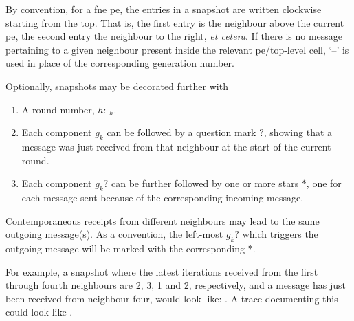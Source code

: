 By convention, for a \gls{fne} \gls{pe}, the entries in a snapshot are written clockwise starting from the top.  That is, the first entry is the neighbour above the current \gls{pe}, the second entry the neighbour to the right, \textit{et cetera}.  If there is no message pertaining to a given neighbour present inside the relevant \gls{pe}/top-level cell, `--' is used in place of the corresponding generation number.

Optionally, snapshots may be decorated further with 
{\renewcommand{\theenumi}{\alph{enumi}}
\begin{enumerate}
    \item A round number, \(h\): \(_h\).
    \item Each component \(g_k\) can be followed by a question mark \(?\), showing that a message was just received from that neighbour at the start of the current round.
    \item Each component \(g_k?\) can be further followed by one or more stars \(*\), one for each message sent because of the corresponding incoming message.
\end{enumerate}}

Contemporaneous receipts from different neighbours may lead to the same outgoing message(s).  As a convention, the left-most \(g_k?\) which triggers the outgoing message will be marked with the corresponding \(*\).

For example, a snapshot where the latest iterations received from the first through fourth neighbours are 2, 3, 1 and 2, respectively, and a message has just been received from neighbour four, would look like:  .  A trace documenting this could look like  \tarr{} .